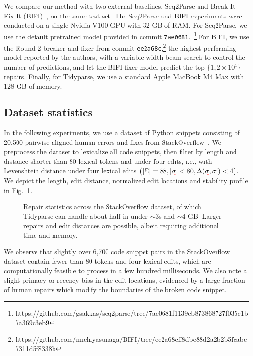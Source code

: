 \documentclass[sigplan,acmsmall,nonacm,screen]{acmart}\settopmatter{printfolios=false,printccs=false,printacmref=false}
\begin{document}
We compare our method with two external baselines, Seq2Parse and Break-It-Fix-It (BIFI)~\cite{yasunaga2021break}, on the same test set. The Seq2Parse and BIFI experiments were conducted on a single Nvidia V100 GPU with 32 GB of RAM. For Seq2Parse, we use the default pretrained model provided in commit \texttt{7ae0681}.~\footnote{https://github.com/gsakkas/seq2parse/tree/7ae0681f1139cb873868727f035c1b7a369c3eb9} For BIFI, we use the Round 2 breaker and fixer from commit \texttt{ee2a68c},\footnote{https://github.com/michiyasunaga/BIFI/tree/ee2a68cff8dbe88d2a2b2b5feabc7311d5f8338b} the highest-performing model reported by the authors, with a variable-width beam search to control the number of predictions, and let the BIFI fixer model predict the top-$\{1, 2\times 10^4\}$ repairs. Finally, for Tidyparse, we use a standard Apple MacBook M4 Max with 128 GB of memory.

\clearpage\subsection{Dataset statistics}\label{sec:rq1}

In the following experiments, we use a dataset of Python snippets consisting of 20,500 pairwise-aligned human errors and fixes from StackOverflow~\cite{wong2019syntax}. We preprocess the dataset to lexicalize all code snippets, then filter by length and distance shorter than 80 lexical tokens and under four edits, i.e., with Levenshtein distance under four lexical edits $\big(|\Sigma| = 88, |\err{\sigma}| < 80, \Delta(\err{\sigma}, \sigma') < 4\big)$. We depict the length, edit distance, normalized edit locations and stability profile in Fig.~\ref{fig:patch_stats}.\vspace{-0.2cm}

\begin{figure}[h!]

\vspace{-0.2cm}
\caption{Repair statistics across the StackOverflow dataset, of which Tidyparse can handle about half in under $\sim$3s and $\sim$4 GB. Larger repairs and edit distances are possible, albeit requiring additional time and memory.}\label{fig:patch_stats}\vspace{-0.2cm}
\end{figure}

We observe that slightly over 6,700 code snippet pairs in the StackOverflow dataset contain fewer than 80 tokens and four lexical edits, which are computationally feasible to process in a few hundred milliseconds. We also note a slight primacy or recency bias in the edit locations, evidenced by a large fraction of human repairs which modify the boundaries of the broken code snippet.
\end{document}
